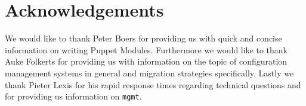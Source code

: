 \thispagestyle{acknowledgements}
\section*{Acknowledgements}\label{sec:acknowledgements}
We would like to thank Peter Boers for providing us with quick and concise information on writing Puppet Modules. Furthermore we would like to thank Auke Folkerts for providing us with information on the topic of configuration management systems in general and migration strategies specifically. Lastly we thank Pieter Lexis for his rapid response times regarding technical questions and for providing us information on \texttt{mgmt}.
